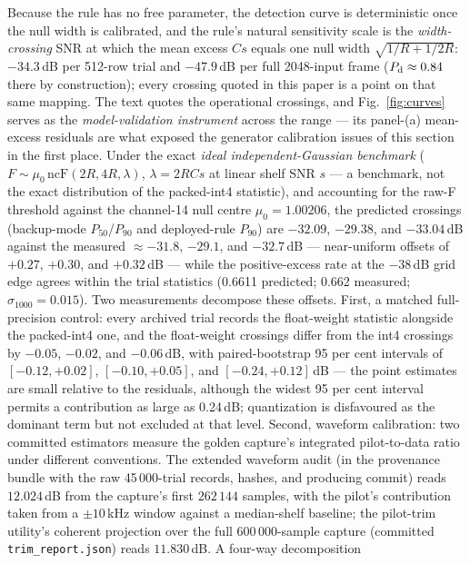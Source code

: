 Because the rule has no free parameter, the detection curve is
deterministic once the null width is calibrated, and the rule's
natural sensitivity scale is the \emph{width-crossing} SNR at which
the mean excess $Cs$ equals one null width $\sqrt{1/R + 1/2R}$:
$-34.3$\,dB per 512-row trial and $-47.9$\,dB per full 2048-input
frame ($P_{\rm d}\approx 0.84$ there by construction); every crossing
quoted in this paper is a point on that same mapping. The text quotes
the operational crossings, and Fig.~\ref{fig:curves}
serves as the \emph{model-validation instrument} across the range ---
its panel-(a) mean-excess residuals are what exposed the generator
calibration issues of this section in the first place.
Under the exact \emph{ideal independent-Gaussian benchmark} ($F \sim
\mu_0\,\mathrm{ncF}(2R, 4R, \lambda)$, $\lambda = 2RCs$ at linear shelf
SNR $s$ --- a benchmark, not the exact distribution of the packed-int4
statistic), and accounting for the raw-F threshold against the channel-14
null centre $\mu_0 = 1.00206$, the predicted crossings (backup-mode
$P_{50}$/$P_{90}$ and deployed-rule $P_{90}$) are $-32.09$,
$-29.38$, and $-33.04$\,dB against the measured $\approx -31.8$,
$-29.1$, and $-32.7$\,dB --- near-uniform offsets of $+0.27$, $+0.30$,
and $+0.32$\,dB --- while the positive-excess rate at the $-38$\,dB grid
edge agrees within the trial statistics (0.6611 predicted; 0.662
measured; $\sigma_{1000} = 0.015$). Two measurements decompose these
offsets. First, a matched full-precision control: every archived trial
records the float-weight statistic alongside the packed-int4 one, and
the float-weight crossings differ from the int4 crossings by
$-0.05$, $-0.02$, and $-0.06$\,dB, with paired-bootstrap 95 per cent
intervals of $[-0.12, +0.02]$, $[-0.10, +0.05]$, and $[-0.24, +0.12]$\,dB
--- the point estimates are small relative to the residuals, although
the widest 95 per cent interval permits a contribution as large as
0.24\,dB; quantization is disfavoured as the dominant term but not
excluded at that level. Second, waveform calibration: two committed estimators measure the
golden capture's integrated pilot-to-data ratio under different
conventions. The extended waveform audit (in the provenance bundle with
the raw 45\,000-trial records, hashes, and producing commit) reads
$12.024$\,dB from the capture's first $262\,144$ samples, with the
pilot's contribution taken from a $\pm 10$\,kHz window against a
median-shelf baseline; the pilot-trim utility's coherent projection
over the full $600\,000$-sample capture (committed
\texttt{trim\_report.json}) reads $11.830$\,dB. A four-way decomposition
